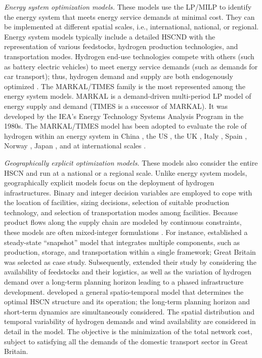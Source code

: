 \documentclass[11pt,3p]{elsarticle}
\begin{document}
\textit{Energy system optimization models.} These models use the LP/MILP to identify the energy system that meets energy service demands at minimal cost. They can be implemented at different spatial scales, i.e., international, national, or regional. Energy system models typically include a detailed HSCND with the representation of various feedstocks, hydrogen production technologies, and transportation modes. Hydrogen end-use technologies compete with others (such as battery electric vehicles) to meet energy service demands (such as demands for car transport); thus, hydrogen demand and supply are both endogenously optimized \citep{agnolucci2013designing}. The MARKAL/TIMES family is the most represented among the energy system models. MARKAL is a demand-driven multi-period LP model of energy supply and demand \citep{Rath1982energy} (TIMES is a successor of MARKAL). It was developed by the IEA's Energy Technology Systems Analysis Program in the 1980s. The MARKAL/TIMES model has been adopted to evaluate the role of hydrogen within an energy system in China \citep{rits2004evaluating}, the US \citep{tseng2005hydrogen,yeh2008optimizing}, the UK \citep{strachan2009soft,winskel2009decarbonising}, Italy \citep{contaldi2008hydrogen}, Spain \citep{contreras2009market}, Norway \citep{rosenberg2010market}, Japan \citep{endo2007market}, and at international scales \citep{gul2009energy}.

\textit{Geographically explicit optimization models.} These models also consider the entire HSCN and run at a national or a regional scale. Unlike energy system models, geographically explicit models focus on the deployment of hydrogen infrastructures. Binary and integer decision variables are employed to cope with the location of facilities, sizing decisions, selection of suitable production technology, and selection of transportation modes among facilities. Because product flows along the supply chain are modeled by continuous constraints, these models are often mixed-integer formulations \citep{eskandarpour2015sustainable}. For instance, \citet{almansoori2006design} established a steady-state ``snapshot'' model that integrates multiple components, such as production, storage, and transportation within a single framework; Great Britain was selected as case study. Subsequently, \citet{almansoori2009design} extended their study by considering the availability of feedstocks and their logistics, as well as the variation of hydrogen demand over a long-term planning horizon leading to a phased infrastructure development. \citet{samsatli2016optimal} developed a general spatio-temporal model that determines the optimal HSCN structure and its operation; the long-term planning horizon and short-term dynamics are simultaneously considered. The spatial distribution and temporal variability of hydrogen demands and wind availability are considered in detail in the model. The objective is the minimization of the total network cost, subject to satisfying all the demands of the domestic transport sector in Great Britain. 
\end{document}
